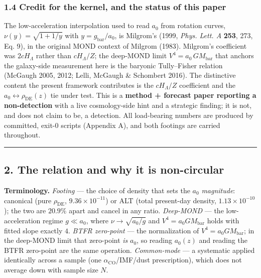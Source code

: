 \documentclass[
]{article}
\begin{document}
\subsubsection{1.4 Credit for the kernel, and the status of this
paper}\label{credit-for-the-kernel-and-the-status-of-this-paper}

The low-acceleration interpolation used to read \(a_0\) from rotation
curves, \(\nu(y)=\sqrt{1+1/y}\) with \(y=g_\mathrm{bar}/a_0\), is Milgrom's
(1999, \emph{Phys. Lett. A} \textbf{253}, 273, Eq. 9), in the original
MOND context of Milgrom (1983). Milgrom's coefficient was
\(2cH_\Lambda\) rather than \(cH_\Lambda/Z\); the deep-MOND limit
\(V^4=a_0\,GM_\mathrm{bar}\) that anchors the galaxy-side measurement here
is the baryonic Tully--Fisher relation (McGaugh 2005, 2012; Lelli,
McGaugh \& Schombert 2016). The distinctive content the present
framework contributes is the \(cH_\Lambda/Z\) coefficient and the
\(a_0\!\leftrightarrow\!\rho_\mathrm{DE}(z)\) tie under test. This is a
\textbf{method + forecast paper reporting a non-detection} with a live
cosmology-side hint and a strategic finding; it is not, and does not
claim to be, a detection. All load-bearing numbers are produced by
committed, exit-0 scripts (Appendix A), and both footings are carried
throughout.

\begin{center}\rule{0.5\linewidth}{0.5pt}\end{center}

\subsection{2. The relation and why it is
non-circular}\label{the-relation-and-why-it-is-non-circular}

\textbf{Terminology.} \emph{Footing} --- the choice of density that sets
the \(a_0\) \emph{magnitude}: canonical (pure \(\rho_\mathrm{DE}\),
\(9.36\times10^{-11}\)) or ALT (total present-day density,
\(1.13\times10^{-10}\)); the two are \(20.9\%\) apart and cancel in any
ratio. \emph{Deep-MOND} --- the low-acceleration regime \(g\ll a_0\),
where \(\nu\to\sqrt{a_0/g}\) and \(V^4=a_0GM_\mathrm{bar}\) holds with
fitted slope exactly \(4\). \emph{BTFR zero-point} --- the normalization
of \(V^4=a_0GM_\mathrm{bar}\); in the deep-MOND limit that zero-point
\emph{is} \(a_0\), so reading \(a_0(z)\) and reading the BTFR zero-point
are the same operation. \emph{Common-mode} --- a systematic applied
identically across a sample (one \(\alpha_\mathrm{CO}\)/IMF/dust
prescription), which does not average down with sample size \(N\).
\end{document}
